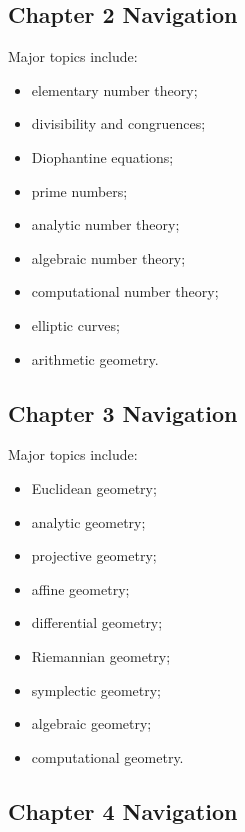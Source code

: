 \subsection{Chapter 2 Navigation}
\label{subsec:index-chapter-two}

Major topics include:

\begin{itemize}
    \item elementary number theory;
    \item divisibility and congruences;
    \item Diophantine equations;
    \item prime numbers;
    \item analytic number theory;
    \item algebraic number theory;
    \item computational number theory;
    \item elliptic curves;
    \item arithmetic geometry.
\end{itemize}

\subsection{Chapter 3 Navigation}
\label{subsec:index-chapter-three}

Major topics include:

\begin{itemize}
    \item Euclidean geometry;
    \item analytic geometry;
    \item projective geometry;
    \item affine geometry;
    \item differential geometry;
    \item Riemannian geometry;
    \item symplectic geometry;
    \item algebraic geometry;
    \item computational geometry.
\end{itemize}

\subsection{Chapter 4 Navigation}
\label{subsec:index-chapter-four}

